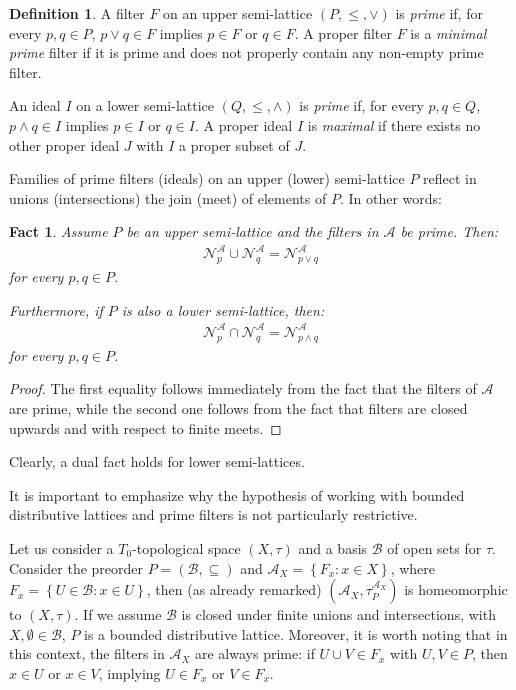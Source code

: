 \documentclass{article}
\newcommand{\aaa}{\mathcal{A} }
\newcommand{\open}[1]{\mathcal{N}^{\mathcal{A}}_{#1}}
\theoremstyle{plain}
\newtheorem{fact}[theorem]{Fact}
\theoremstyle{definition}
\newtheorem{definition}[theorem]{Definition}
\theoremstyle{remark}
\newcommand{\bp}[1]{\left\lbrace #1 \right\rbrace}
\newcommand{\0}{\mathbbm 0}
\newcommand{\1}{\mathbbm 1}
\newcommand{\2}{\mathbbm 2}
\begin{document}
 \begin{definition}
 \label{def:primefilter}
     A filter $F$ on an upper semi-lattice $(P,\leq,\vee)$ is \emph{prime} if, for every $p,q \in P$, $p \vee q\in F$ implies $p \in F$ or $q \in F$. A proper filter $F$ is a \emph{minimal prime} filter if it is prime and does not properly contain any non-empty prime filter. 
 
 An ideal $I$ on a lower semi-lattice $(Q,\leq,\wedge)$ is \emph{prime} if, for every $p,q \in Q$, $p \wedge q\in I$ implies $p \in I$ or $q \in I$. A proper ideal $I$ is \emph{maximal} if there exists no other proper ideal $J$ with $I$ a proper subset of $J$.
 \end{definition}
 
Families of prime filters (ideals) on an upper (lower) semi-lattice $P$ reflect in unions (intersections) the join (meet) of elements of $P$. In other words:  

\begin{fact}
\label{fact:un&intprimefilters}
Assume $P$ be an upper semi-lattice and the filters in $\aaa$ be prime. Then: \begin{align*}
    \open{p} \cup \open{q} = \open{p \vee q} 
\end{align*} for every $p,q \in P$.

Furthermore, if $P$ is also a lower semi-lattice, then: 
\begin{align*}
    \open{p} \cap \open{q} = \open{p \wedge q} 
\end{align*} for every $p,q \in P$.
\end{fact}

\begin{proof}
The first equality follows immediately from the fact that the filters of $\aaa$ are prime, while the second one follows from the fact that filters are closed upwards and with respect to finite meets. 
\end{proof}

Clearly, a dual fact holds for lower semi-lattices.


It is important to emphasize why the hypothesis of working with   bounded distributive lattices and prime filters is not particularly restrictive.

Let us consider a $T_0$-topological space $(X, \tau)$ and  a basis $\mathcal{B}$ of open sets for $\tau$. Consider the preorder $P=(\mathcal{B}, \subseteq)$ and $\aaa_X=\bp{F_x : x \in X}$, where $F_x=\bp{ U \in \mathcal{B}: x \in U}$, then (as already remarked) $(\aaa_X, \tau^{\aaa_X}_P)$ is homeomorphic to $(X, \tau)$. If we assume $\mathcal{B}$ is closed under finite unions and intersections, with $X,\emptyset \in \mathcal{B}$, $P$ is a bounded distributive lattice.
Moreover, it is worth noting that in this context, the filters in $\aaa_X$ are always prime: if $U \cup V \in F_x$ with $U, V \in P$, then $x \in U$ or $x \in V$, implying $U \in F_x$ or $V \in F_x$.
\end{document}
